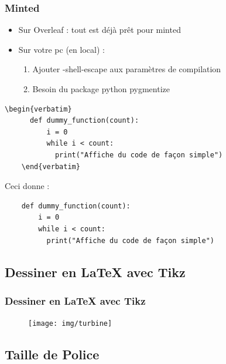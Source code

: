 \begin{frame}[fragile]
  \frametitle{Minted}

  \begin{itemize}
    \item Sur Overleaf : tout est déjà prêt pour minted
    \item Sur votre pc (en local) :
    \begin{enumerate}
      \item Ajouter -shell-escape aux paramètres de compilation
      \item Besoin du package python pygmentize
    \end{enumerate}
  \end{itemize}

  \begin{lstlisting}[mathescape=true]
    \begin{verbatim}
      def dummy_function(count):
          i = 0
          while i < count:
            print("Affiche du code de façon simple")
    \end{verbatim}\end{lstlisting}

  Ceci donne :

  \begin{verbatim}
    def dummy_function(count):
        i = 0
        while i < count:
          print("Affiche du code de façon simple")
  \end{verbatim}
\end{frame}

\subsection{Dessiner en LaTeX avec Tikz}

\begin{frame}[fragile]
  \frametitle{Dessiner en LaTeX avec Tikz}
  \begin{figure}[!ht] \centering
    \texttt{[image: img/turbine]}
  \end{figure}
\end{frame}

\subsection{Taille de Police}

